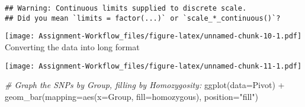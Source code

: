 \documentclass[
]{article}
\newenvironment{Shaded}{\begin{snugshade}}{\end{snugshade}}
\newcommand{\AttributeTok}[1]{\textcolor[rgb]{0.77,0.63,0.00}{#1}}
\newcommand{\CommentTok}[1]{\textcolor[rgb]{0.56,0.35,0.01}{\textit{#1}}}
\newcommand{\FunctionTok}[1]{\textcolor[rgb]{0.00,0.00,0.00}{#1}}
\newcommand{\NormalTok}[1]{#1}
\newcommand{\OtherTok}[1]{\textcolor[rgb]{0.56,0.35,0.01}{#1}}
\newcommand{\SpecialCharTok}[1]{\textcolor[rgb]{0.00,0.00,0.00}{#1}}
\newcommand{\StringTok}[1]{\textcolor[rgb]{0.31,0.60,0.02}{#1}}
\begin{document}
\begin{verbatim}
## Warning: Continuous limits supplied to discrete scale.
## Did you mean `limits = factor(...)` or `scale_*_continuous()`?
\end{verbatim}

\texttt{[image: Assignment-Workflow\_files/figure-latex/unnamed-chunk-10-1.pdf]}
Converting the data into long format

\begin{Shaded}
\end{Shaded}

\texttt{[image: Assignment-Workflow\_files/figure-latex/unnamed-chunk-11-1.pdf]}

\begin{Shaded}
\begin{Highlighting}[]
\CommentTok{\# Graph the SNPs by Group, filling by Homozygosity:}
\FunctionTok{ggplot}\NormalTok{(}\AttributeTok{data=}\NormalTok{Pivot) }\SpecialCharTok{+}
  \FunctionTok{geom\_bar}\NormalTok{(}\AttributeTok{mapping=}\FunctionTok{aes}\NormalTok{(}\AttributeTok{x=}\NormalTok{Group, }\AttributeTok{fill=}\NormalTok{homozygous), }\AttributeTok{position=}\StringTok{"fill"}\NormalTok{)}
\end{Highlighting}
\end{Shaded}
\end{document}
